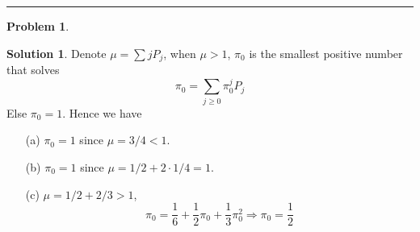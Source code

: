 \documentclass[a4paper, 10pt]{article}
\theoremstyle{definition}
\newtheorem{problem}{Problem}
\theoremstyle{hSol}
\newtheorem*{solution}{Solution}
\begin{document}
\noindent\rule{16cm}{0.4pt}
\begin{problem} 
\end{problem}
\begin{solution} Denote $\mu=\sum jP_j$, when $\mu>1$, $\pi_0$ is the smallest positive number that solves
\begin{equation}
  \pi_0 = \sum_{j\geq 0} \pi_0^j P_j
\end{equation}
Else $\pi_0=1$. Hence we have
\begin{itemize}
  \item[(a)] $\pi_0 = 1$ since $\mu=3/4<1$.
  \item[(b)] $\pi_0 = 1$ since $\mu = 1/2 + 2\cdot 1/4 = 1$.
  \item[(c)] $\mu = 1/2+2/3 >1$,
  \begin{equation}
    \pi_0 = \frac{1}{6} + \frac{1}{2}\pi_0 + \frac{1}{3} \pi_0^2 \Rightarrow \pi_0 = \frac{1}{2}
  \end{equation}
\end{itemize}
\end{solution}
\end{document}
